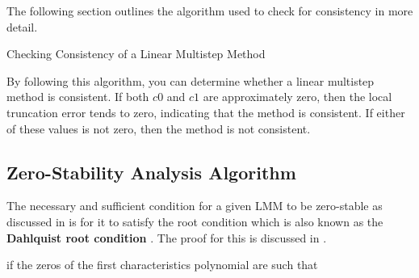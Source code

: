 The following section outlines the algorithm used to check for consistency in more detail.


\begin{algorithm}
   \caption{Checking Consistency of a Linear Multistep Method}
   \begin{algorithmic}[1] %
       
   
   
   
   
   \end{algorithmic}
   \end{algorithm}


By following this algorithm, you can determine whether a linear multistep method is consistent. If both $c0$ and $c1$ are approximately zero, then the local truncation error tends to zero, indicating that the method is consistent. If either of these values is not zero, then the method is not consistent.


\subsection{Zero-Stability Analysis Algorithm}
The necessary and sufficient condition for a given LMM to be zero-stable as discussed in \cite{2022JFatokunEtAl} is for it to satisfy the root condition which is also known as the \textbf{Dahlquist root condition} \cite{lambert1977}. The proof for this is discussed in \cite{keller2020discovery}.

if the zeros of the first characteristics polynomial are such that


